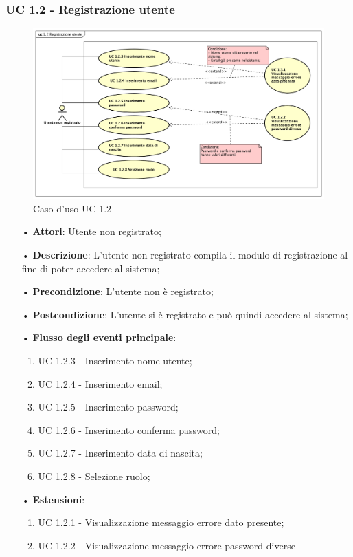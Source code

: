 \subsubsection{UC 1.2 - Registrazione utente}
\begin{figure}[H]
	\centering
	\includegraphics[width=17cm]{img/UC12.png} 
	\caption{Caso d'uso UC 1.2}\label{fig:12}
\end{figure}
\begin{itemize}
	\item[•]\textbf{Attori}: Utente non registrato;
	\item[•]\textbf{Descrizione}: L'utente non registrato compila il modulo di registrazione al fine di poter accedere al sistema;
	\item[•]\textbf{Precondizione}: L'utente non è registrato;
	\item[•]\textbf{Postcondizione}: L'utente si è registrato e può quindi accedere al sistema;
	\item[•]\textbf{Flusso degli eventi principale}:
	\begin{enumerate}
		\item UC 1.2.3 - Inserimento nome utente;
		\item UC 1.2.4 - Inserimento email;
		\item UC 1.2.5 - Inserimento password;
		\item UC 1.2.6 - Inserimento conferma password;
		\item UC 1.2.7 - Inserimento data di nascita;
		\item UC 1.2.8 - Selezione ruolo;
	\end{enumerate}
	\item[•]\textbf{Estensioni}:
	\begin{enumerate}
		\item UC 1.2.1 - Visualizzazione messaggio errore dato presente;
		\item UC 1.2.2 - Visualizzazione messaggio errore password diverse
	\end{enumerate}
\end{itemize}

